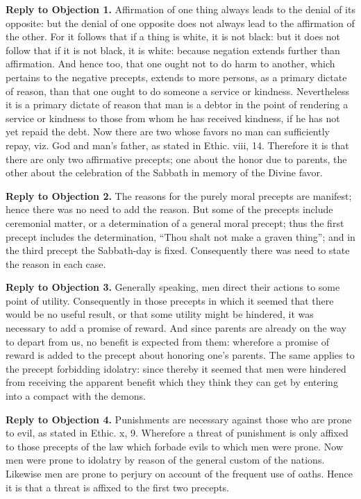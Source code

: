 \textbf{Reply to Objection 1.} Affirmation of one thing always leads to the denial of its opposite: but the denial of one opposite does not always lead to the affirmation of the other. For it follows that if a thing is white, it is not black: but it does not follow that if it is not black, it is white: because negation extends further than affirmation. And hence too, that one ought not to do harm to another, which pertains to the negative precepts, extends to more persons, as a primary dictate of reason, than that one ought to do someone a service or kindness. Nevertheless it is a primary dictate of reason that man is a debtor in the point of rendering a service or kindness to those from whom he has received kindness, if he has not yet repaid the debt. Now there are two whose favors no man can sufficiently repay, viz. God and man's father, as stated in Ethic. viii, 14. Therefore it is that there are only two affirmative precepts; one about the honor due to parents, the other about the celebration of the Sabbath in memory of the Divine favor.

\textbf{Reply to Objection 2.} The reasons for the purely moral precepts are manifest; hence there was no need to add the reason. But some of the precepts include ceremonial matter, or a determination of a general moral precept; thus the first precept includes the determination, ``Thou shalt not make a graven thing''; and in the third precept the Sabbath-day is fixed. Consequently there was need to state the reason in each case.

\textbf{Reply to Objection 3.} Generally speaking, men direct their actions to some point of utility. Consequently in those precepts in which it seemed that there would be no useful result, or that some utility might be hindered, it was necessary to add a promise of reward. And since parents are already on the way to depart from us, no benefit is expected from them: wherefore a promise of reward is added to the precept about honoring one's parents. The same applies to the precept forbidding idolatry: since thereby it seemed that men were hindered from receiving the apparent benefit which they think they can get by entering into a compact with the demons.

\textbf{Reply to Objection 4.} Punishments are necessary against those who are prone to evil, as stated in Ethic. x, 9. Wherefore a threat of punishment is only affixed to those precepts of the law which forbade evils to which men were prone. Now men were prone to idolatry by reason of the general custom of the nations. Likewise men are prone to perjury on account of the frequent use of oaths. Hence it is that a threat is affixed to the first two precepts.


